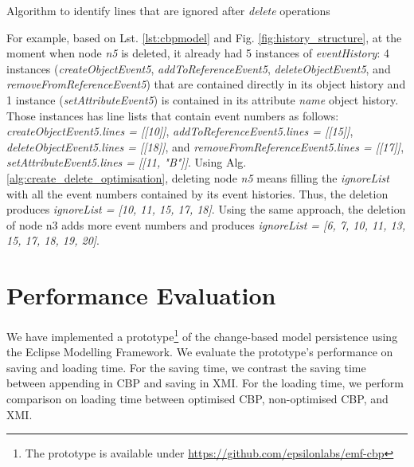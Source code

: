 \documentclass{llncs}
\begin{document}
\begin{algorithm}
\begin{small}
\end{small}
\caption{Algorithm to identify lines that are ignored after \emph{delete} operations}
\label{alg:create_delete_optimisation}
\end{algorithm}

For example, based on Lst. \ref{lst:cbpmodel} and Fig. \ref{fig:history_structure}, at the moment when node \emph{n5} is deleted, it already had 5 instances of \emph{eventHistory}: 4 instances (\emph{createObjectEvent5}, \emph{addToReferenceEvent5}, \emph{deleteObjectEvent5}, and \emph{removeFromReferenceEvent5}) that are contained directly in its object history and 1 instance (\emph{setAttributeEvent5}) is contained in its attribute \emph{name} object history. Those instances has line lists that contain event numbers as follows: \emph{createObjectEvent5.lines = [[10]]}, \emph{addToReferenceEvent5.lines = [[15]]}, \emph{deleteObjectEvent5.lines = [[18]]}, and \emph{removeFromReferenceEvent5.lines = [[17]]}, \emph{setAttributeEvent5.lines = [[11, "B"]]}. Using Alg. \ref{alg:create_delete_optimisation}, deleting node \emph{n5} means filling the \emph{ignoreList} with all the event numbers contained by its event histories. Thus, the deletion produces \emph{ignoreList = [10, 11, 15, 17, 18]}. Using the same approach, the deletion of node n3 adds more event numbers and produces \emph{ignoreList = [6, 7, 10, 11, 13, 15, 17, 18, 19, 20]}.

\section{Performance Evaluation}
\label{sec:performance_evaluation}
We have implemented a prototype\footnote{The prototype is available under \url{https://github.com/epsilonlabs/emf-cbp}} of the change-based model persistence using the Eclipse Modelling Framework. We evaluate the prototype's performance on saving and loading time. For the saving time, we contrast the saving time between appending in CBP and saving in XMI. For the loading time, we perform comparison on loading time between optimised CBP, non-optimised CBP, and XMI.
\end{document}
